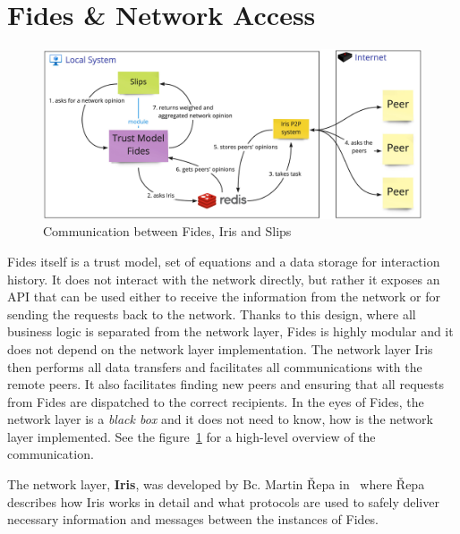 \section{Fides \& Network Access}
\label{sec:fides-and-network-access}

\begin{figure}[ht]
    \centering
    \includegraphics[width=1.0\textwidth]{assets/communication_architecture.jpeg}
    \caption{Communication between Fides, Iris and Slips}
    \label{fig:fides-api-network}
\end{figure}

Fides itself is a trust model, set of equations and a data storage for interaction history. 
It does not interact with the network directly, but rather it exposes an API that can be used either to receive the information from the network or for sending the requests back to the network.
Thanks to this design, where all business logic is separated from the network layer, Fides is highly modular and it does not depend on the network layer implementation.
The network layer Iris then performs all data transfers and facilitates all communications with the remote peers.
It also facilitates finding new peers and ensuring that all requests from Fides are dispatched to the correct recipients.
In the eyes of Fides, the network layer is a \textit{black box} and it does not need to know, how is the network layer implemented.
See the figure~\ref{fig:fides-api-network} for a high-level overview of the communication.

The network layer, \textbf{Iris}, was developed by Bc. Martin Řepa in~\cite{nl} where Řepa describes how Iris works in detail and what protocols are used to safely deliver necessary information and messages between the instances of Fides.